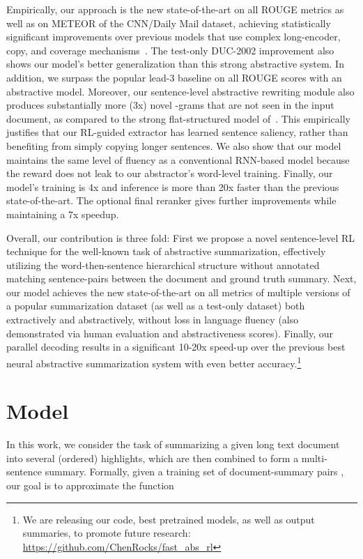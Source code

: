 \documentclass[11pt,a4paper]{article}
\begin{document}
Empirically, our approach is the new state-of-the-art on all ROUGE metrics \citep{lin:2004:ACLsummarization} as well as on METEOR \cite{denkowski:lavie:meteor-wmt:2014} of the CNN/Daily Mail dataset, achieving statistically significant improvements over previous models that use complex long-encoder, copy, and coverage mechanisms~\citep{get_to_the_point}.
The test-only DUC-2002 improvement also shows our model's better generalization than this strong abstractive system.
In addition, we surpass the popular lead-3 baseline on all ROUGE scores with an abstractive model. Moreover, our sentence-level abstractive rewriting module also produces substantially more (3x) novel -grams that are not seen in the input document, as compared to the strong flat-structured model of~.
This empirically justifies that our RL-guided extractor has learned sentence saliency, rather than benefiting from simply copying longer sentences.
We also show that our model maintains the same level of fluency as a conventional RNN-based model because the reward does not leak to our abstractor's word-level training.
Finally, our model's training is 4x and inference is more than 20x faster than the previous state-of-the-art. The optional final reranker gives further improvements while maintaining a 7x speedup.

Overall, our contribution is three fold: 
First we propose a novel sentence-level RL technique for the well-known task of abstractive summarization, effectively utilizing the word-then-sentence hierarchical structure without annotated matching sentence-pairs between the document and ground truth summary.
Next, our model achieves the new state-of-the-art on all metrics of multiple versions of a popular summarization dataset (as well as a test-only dataset) both extractively and abstractively, without loss in language fluency (also demonstrated via human evaluation and abstractiveness scores). 
Finally, our parallel decoding results in a significant 10-20x speed-up over the previous best neural abstractive summarization system with even better accuracy.\footnote{We are releasing our code, best pretrained models, as well as output summaries, to promote future research: \url{https://github.com/ChenRocks/fast_abs_rl}} 
\section{Model}
In this work, we consider the task of summarizing a given long text document
into several (ordered) highlights, which are then combined to form a multi-sentence summary.
Formally, given a training set of document-summary pairs , 
our goal is to approximate the function
\end{document}

